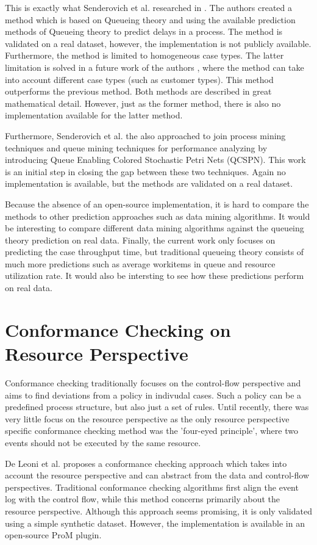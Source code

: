 This is exactly what Senderovich et al. researched in \cite{Senderovich2014}. The authors created a method which is based on Queueing theory and using the available prediction methods of Queueing theory to predict delays in a process. The method is validated on a real dataset, however, the implementation is not publicly available. Furthermore, the method is limited to  homogeneous case types. The latter limitation is solved in a future work of the authors \cite{Senderovich2015b}, where the method can take into account different case types (such as customer types). This method outperforms the previous method. Both methods are described in great mathematical detail. However, just as the former method, there is also no implementation available for the latter method. 

Furthermore, Senderovich et al. the \cite{Senderovich2015a} also approached to join process mining techniques and queue mining techniques for performance analyzing by introducing Queue Enabling Colored Stochastic Petri Nets (QCSPN). This work is an initial step in closing the gap between these two techniques. Again no implementation is available, but the methods are validated on a real dataset. 

Because the absence of an open-source implementation, it is hard to compare the methods to other prediction approaches such as data mining algorithms. It would be interesting to compare different data mining algorithms against the queueing theory prediction on real data. Finally, the current work only focuses on predicting the case throughput time, but traditional queueing theory consists of much more predictions such as average workitems in queue and resource utilization rate. It would also be intersting to see how these predictions perform on real data.

\section{Conformance Checking on Resource Perspective}
Conformance checking traditionally focuses on the control-flow perspective and aims to find deviations from a policy in indivudal cases. Such a policy can be a predefined process structure, but also just a set of rules. Until recently, there was very little focus on the resource perspective as the only resource perspective specific conformance checking method was the 'four-eyed principle', where two events should not be executed by the same resource. 

De Leoni et al. \cite{DeLeoni2012} proposes a conformance checking approach which takes into account the resource perspective and can abstract from the data and control-flow perspectives. Traditional conformance checking algorithms first align the event log with the control flow, while this method concerns primarily about the resource perspective. Although this approach seems promising, it is only validated using a simple synthetic dataset. However, the implementation is available in an open-source ProM plugin. 

